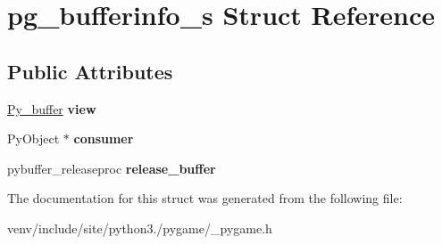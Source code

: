 \hypertarget{structpg__bufferinfo__s}{}\section{pg\+\_\+bufferinfo\+\_\+s Struct Reference}
\label{structpg__bufferinfo__s}
\subsection*{Public Attributes}
\begin{DoxyCompactItemize}
\item 
\mbox{\label{structpg__bufferinfo__s_adb572aee8152d8eb6f08c9ed2ffe465c}} 
\hyperlink{structbufferinfo}{Py\+\_\+buffer} {\bfseries view}
\item 
\mbox{\label{structpg__bufferinfo__s_a025991b5e6a456804b14c74327ceb557}} 
Py\+Object $\ast$ {\bfseries consumer}
\item 
\mbox{\label{structpg__bufferinfo__s_ad3532176c7543016ba62b6fcfbed5ea9}} 
pybuffer\+\_\+releaseproc {\bfseries release\+\_\+buffer}
\end{DoxyCompactItemize}


The documentation for this struct was generated from the following file\+:\begin{DoxyCompactItemize}
\item 
venv/include/site/python3./pygame/\+\_\+pygame.\+h\end{DoxyCompactItemize}
